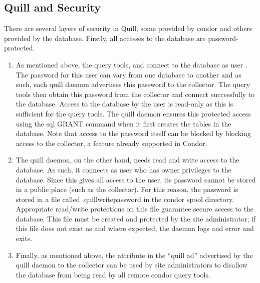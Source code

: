 \subsection{\label{sec:Quill-Security}Quill and Security}

There are several layers of security in Quill, some provided by condor and
others provided by the database.  Firstly, all accesses to the database
are password-protected.

\begin{enumerate}
\item As mentioned above, the query tools,  and
 connect to the database as user .
The password for this user can vary from one database to another and
as such, each quill daemon advertises this password to the collector.
The query tools then obtain this password from the collector and
connect successfully to the database.  Access to the database by the
 user is read-only as this is sufficient for the
query tools.  The quill daemon ensures this protected access using the sql
GRANT command when it first creates the tables in the database.  Note that
access to the  password itself can be blocked by
blocking access to the collector, a feature already supported in Condor.

\item The quill daemon, on the other hand, needs read and write access
to the database.  As such, it connects as user 
who has owner privileges to the database.  Since this gives all
access to the  user, its password cannot
be stored in a public place (such as the collector).  For this
reason, the  password is stored in a file called
.quillwritepassword in the condor spool directory.  Appropriate read/write
protections on this file guarantee secure access to the database.
This file must be created and protected by the site administrator;
if this file does not exist as and where expected, the 
daemon logs and error and exits.

\item Finally, as mentioned above, the
 attribute in the ``quill ad'' advertised
by the quill daemon to the collector can be used by site administrators
to disallow the database from being read by all remote condor query tools.

\end{enumerate}

